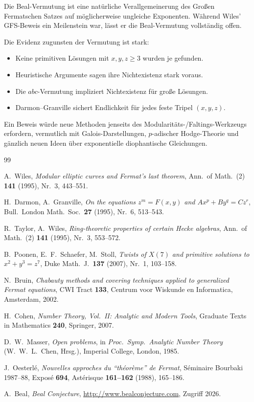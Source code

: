 \documentclass[12pt,a4paper]{amsart}
\theoremstyle{definition}
\theoremstyle{remark}
\begin{document}
Die Beal-Vermutung ist eine natürliche Verallgemeinerung des Großen Fermatschen Satzes
auf möglicherweise ungleiche Exponenten. Während Wiles' GFS-Beweis ein Meilenstein war,
lässt er die Beal-Vermutung vollständig offen.

Die Evidenz zugunsten der Vermutung ist stark:
\begin{itemize}
  \item Keine primitiven Lösungen mit $x,y,z \geq 3$ wurden je gefunden.
  \item Heuristische Argumente sagen ihre Nichtexistenz stark voraus.
  \item Die $abc$-Vermutung impliziert Nichtexistenz für große Lösungen.
  \item Darmon--Granville sichert Endlichkeit für jedes feste Tripel $(x,y,z)$.
\end{itemize}

Ein Beweis würde neue Methoden jenseits des Modularitäts-/Faltings-Werkzeugs erfordern,
vermutlich mit Galois-Darstellungen, $p$-adischer Hodge-Theorie und gänzlich neuen
Ideen über exponentielle diophantische Gleichungen.

\begin{thebibliography}{99}

A.~Wiles,
\textit{Modular elliptic curves and Fermat's last theorem},
Ann.\ of Math.\ (2) \textbf{141} (1995), Nr.\ 3, 443--551.

H.~Darmon, A.~Granville,
\textit{On the equations $z^m = F(x,y)$ and $Ax^p + By^q = Cz^r$},
Bull.\ London Math.\ Soc.\ \textbf{27} (1995), Nr.\ 6, 513--543.

R.~Taylor, A.~Wiles,
\textit{Ring-theoretic properties of certain Hecke algebras},
Ann.\ of Math.\ (2) \textbf{141} (1995), Nr.\ 3, 553--572.

B.~Poonen, E.~F.\ Schaefer, M.~Stoll,
\textit{Twists of $X(7)$ and primitive solutions to $x^2 + y^3 = z^7$},
Duke Math.\ J.\ \textbf{137} (2007), Nr.\ 1, 103--158.

N.~Bruin,
\textit{Chabauty methods and covering techniques applied to generalized Fermat equations},
CWI Tract \textbf{133}, Centrum voor Wiskunde en Informatica, Amsterdam, 2002.

H.~Cohen,
\textit{Number Theory, Vol.\ II: Analytic and Modern Tools},
Graduate Texts in Mathematics \textbf{240}, Springer, 2007.

D.~W.\ Masser,
\textit{Open problems},
in \textit{Proc.\ Symp.\ Analytic Number Theory} (W.~W.~L.\ Chen, Hrsg.),
Imperial College, London, 1985.

J.~Oesterlé,
\textit{Nouvelles approches du ``théorème'' de Fermat},
Séminaire Bourbaki 1987--88, Exposé \textbf{694}, Astérisque \textbf{161--162} (1988), 165--186.

A.~Beal,
\textit{Beal Conjecture},
\url{http://www.bealconjecture.com}, Zugriff 2026.

\end{thebibliography}
\end{document}

